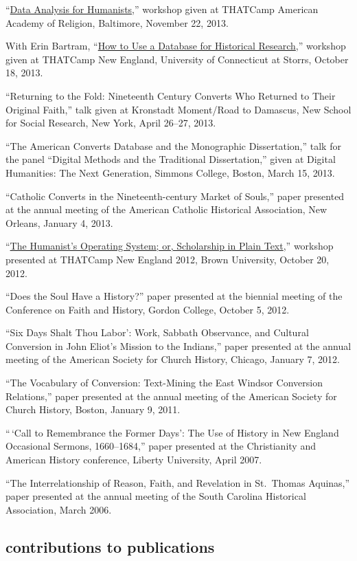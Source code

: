 \documentclass[11pt]{article}
\begin{document}
``\href{/workshops/}{Data Analysis for Humanists},'' workshop given at
THATCamp American Academy of Religion, Baltimore, November 22, 2013.

With Erin Bartram, ``\href{/workshops/}{How to Use a Database for
Historical Research},'' workshop given at THATCamp New England,
University of Connecticut at Storrs, October 18, 2013.

``Returning to the Fold: Nineteenth Century Converts Who Returned to
Their Original Faith,'' talk given at Kronstadt Moment/Road to Damascus,
New School for Social Research, New York, April 26--27, 2013.

``The American Converts Database and the Monographic Dissertation,''
talk for the panel ``Digital Methods and the Traditional Dissertation,''
given at Digital Humanities: The Next Generation, Simmons College,
Boston, March 15, 2013.

``Catholic Converts in the Nineteenth-century Market of Souls,'' paper
presented at the annual meeting of the American Catholic Historical
Association, New Orleans, January 4, 2013.

``\href{/workshops/}{The Humanist's Operating System; or, Scholarship in
Plain Text},'' workshop presented at THATCamp New England 2012, Brown
University, October 20, 2012.

``Does the Soul Have a History?'' paper presented at the biennial
meeting of the Conference on Faith and History, Gordon College, October
5, 2012.

``Six Days Shalt Thou Labor': Work, Sabbath Observance, and Cultural
Conversion in John Eliot's Mission to the Indians,'' paper presented at
the annual meeting of the American Society for Church History, Chicago,
January 7, 2012.

``The Vocabulary of Conversion: Text-Mining the East Windsor Conversion
Relations,'' paper presented at the annual meeting of the American
Society for Church History, Boston, January 9, 2011.

``\,`Call to Remembrance the Former Days': The Use of History in New
England Occasional Sermons, 1660--1684,'' paper presented at the
Christianity and American History conference, Liberty University, April
2007.

``The Interrelationship of Reason, Faith, and Revelation in St.~Thomas
Aquinas,'' paper presented at the annual meeting of the South Carolina
Historical Association, March 2006.

\subsection{contributions to
publications}\label{contributions-to-publications}
\end{document}
